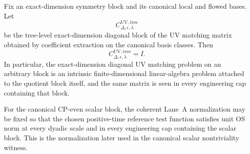 \begin{theorem}
Fix an exact-dimension symmetry block and its canonical local and flowed bases. Let
\[
C^{\mathrm{UV,tree}}_{\Delta,\epsilon,\lambda}
\]
be the tree-level exact-dimension diagonal block of the UV matching matrix obtained by coefficient extraction on the canonical basis classes. Then
\[
C^{\mathrm{UV,tree}}_{\Delta,\epsilon,\lambda}=I.
\]
In particular, the exact-dimension diagonal UV matching problem on an arbitrary block is an intrinsic finite-dimensional linear-algebra problem attached to the quotient block itself, and the same matrix is seen in every engineering cap containing that block.
\end{theorem}

\begin{lemma}
For the canonical CP-even scalar block, the coherent Lane~A normalization may be fixed so that the chosen positive-time reference test function satisfies unit OS norm at every dyadic scale and in every engineering cap containing the scalar block. This is the normalization later used in the canonical scalar nontriviality witness.
\end{lemma}

